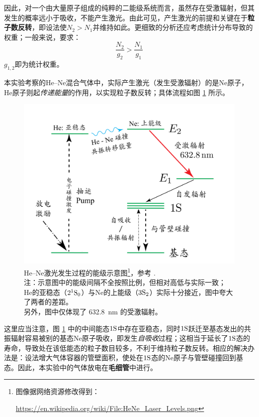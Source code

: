 \documentclass[aps,pre,12pt,preprint,%
	onecolumn,showpacs,showkeys,nofootinbib]{revtex4-1}
\begin{document}
	因此，对一个由大量原子组成的纯粹的二能级系统而言，虽然存在受激辐射，但其发生的概率远小于吸收，不能产生激光。由此可见，产生激光的前提和关键在于\textbf{粒子数反转}，即设法使$N_2 > N_1$并维持如此。更细致的分析还应考虑统计分布导致的权重；一般来说，要求：
	\begin{equation}
		\frac{N_2}{g_2} > \frac{N_1}{g_1}
	\end{equation}
	$g_{1,2}$即为统计权重。
	
	本实验考察的He--Ne混合气体中，实际产生激光（发生受激辐射）的是Ne原子，He原子则起\textit{传递能量}的作用，以实现粒子数反转；具体流程如图 \ref{fig:HeNeLevel} 所示。
	\begin{figure}[!h]
	\centering
	\vspace{-1.2\baselineskip}
	\includegraphics[width=.8\linewidth]{HeNeLaserLevel.png}
	\caption[\textup{He--Ne}激光原理]{%
		\textup{He--Ne}激光发生过程的能级示意图\footnote{%
			图像据网络资源修改得到：\par
			\noindent%
			\url{https://en.wikipedia.org/wiki/File:HeNe_Laser_Levels.png}%
		}，参考 \cite{textbook}. \\[1ex]
		注：示意图中的能级间隔不全按照比例，但相对高低与实际一致；\\
		\textup{He}的亚稳态（$2^1\mathrm{S}_0$）与\textup{Ne}的上能级（$3\mathrm{S}_2$）实际十分接近，图中夸大了两者的差距。\\
		另外，图中仅体现了 \SI{632.8}{\nm} 的受激辐射。
		\vspace{1ex}
	}
	\label{fig:HeNeLevel}
	\end{figure}
\FloatBarrier
	
	这里应当注意，图 \ref{fig:HeNeLevel} 中的中间能态$1\mathrm{S}$中存在亚稳态，同时$1\mathrm{S}$跃迁至基态发出的共振辐射容易被别的基态Ne原子吸收，即发生\textit{自吸收}过程\supercite{textbook}；这相当于延长了$1\mathrm{S}$态的寿命，导致处在该低能态的粒子数目较多，不利于维持粒子数反转。相应的解决办法是：设法增大气体容器的管壁面积，使处在$1\mathrm{S}$态的Ne原子与管壁碰撞回到基态。因此，本实验中的气体放电在\textbf{毛细管}中进行。
	
\end{document}
